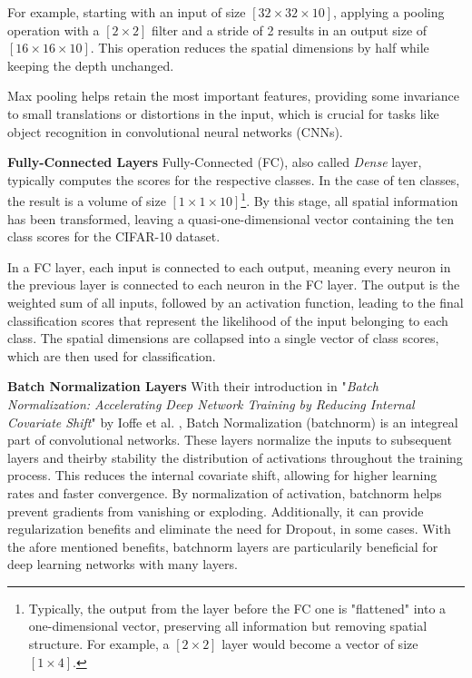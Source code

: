 For example, starting with an input of size $[32 \times 32 \times 10]$, applying a pooling operation with a $[2 \times 2]$ filter and a stride of 2 results in an output size of $[16 \times 16 \times 10]$. This operation reduces the spatial dimensions by half while keeping the depth unchanged.

Max pooling helps retain the most important features, providing some invariance to small translations or distortions in the input, which is crucial for tasks like object recognition in convolutional neural networks (CNNs).


\vspace{1em}

\textbf{Fully-Connected Layers}\label{theoretical_classification_fully_connected_layers}
Fully-Connected (FC), also called \textit{Dense} layer, typically computes the scores for the respective classes. In the case of ten classes, the result is a volume of size $[1 \times 1 \times 10]$\footnote{Typically, the output from the layer before the FC one is "flattened" into a one-dimensional vector, preserving all information but removing spatial structure. For example, a $[2 \times 2]$ layer would become a vector of size $[1 \times 4]$.}. By this stage, all spatial information has been transformed, leaving a quasi-one-dimensional vector containing the ten class scores for the CIFAR-10 dataset.

In a FC layer, each input is connected to each output, meaning every neuron in the previous layer is connected to each neuron in the FC layer. The output is the weighted sum of all inputs, followed by an activation function, leading to the final classification scores that represent the likelihood of the input belonging to each class. The spatial dimensions are collapsed into a single vector of class scores, which are then used for classification.

\textbf{Batch Normalization Layers}\label{theoretical_classification_batchnorm_layers}
With their introduction in "\textit{Batch Normalization: Accelerating Deep Network Training by Reducing Internal Covariate Shift}" by Ioffe et al. \cite{ioffe2015batchnormalizationacceleratingdeep}, Batch Normalization (batchnorm) is an integreal part of convolutional networks. These layers normalize the inputs to subsequent layers and theirby stability the distribution of activations throughout the training process. This reduces the internal covariate shift, allowing for higher learning rates and faster convergence. By normalization of activation, batchnorm helps prevent gradients from vanishing or exploding. Additionally, it can provide regularization benefits and eliminate the need for Dropout, in some cases. With the afore mentioned benefits, batchnorm layers are particularily beneficial for deep learning networks with many layers.



